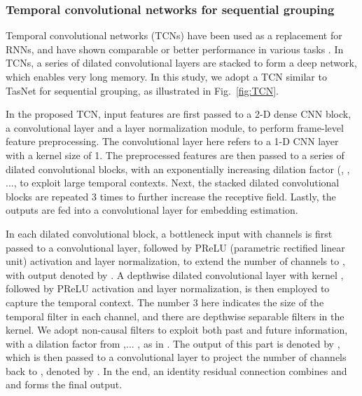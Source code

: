 \documentclass[journal]{IEEEtran}
\begin{document}
    
\subsubsection{Temporal convolutional networks for sequential grouping}
\label{sec:4.2.1}

Temporal convolutional networks (TCNs) have been used as a replacement for RNNs, and have shown comparable or better performance in various tasks \cite{TCN1} \cite{TCN0} \cite{Tasnet} \cite{ashu}.
In TCNs, a series of dilated convolutional layers are stacked to form a deep network, which enables very long memory.
In this study, we adopt a TCN similar to TasNet \cite{Tasnet} for sequential grouping, as illustrated in Fig.~\ref{fig:TCN}.


In the proposed TCN, input features are first passed to a 2-D dense CNN block, a  convolutional layer and a layer normalization module, to perform frame-level feature preprocessing.
The  convolutional layer here refers to a 1-D CNN layer with a kernel size of 1.
The preprocessed features are then passed to a series of dilated convolutional blocks, with an exponentially increasing dilation factor (, , ...,  to exploit large temporal contexts.
Next, the  stacked dilated convolutional blocks are repeated 3 times to further increase the receptive field.
Lastly, the outputs are fed into a  convolutional layer for embedding estimation.

In each dilated convolutional block, a bottleneck input with  channels  is first passed to a  convolutional layer, followed by PReLU (parametric rectified linear unit) activation \cite{prelu} and layer normalization, to extend the number of channels to , with output denoted by .
A depthwise dilated convolutional layer \cite{depthwise} with kernel , followed by PReLU activation and layer normalization, is then employed to capture the temporal context.
The number 3 here indicates the size of the temporal filter in each channel, and there are  depthwise separable filters in the kernel.
We adopt non-causal filters to exploit both past and future information, with a dilation factor from ,... , as in \cite{Tasnet}.
The output of this part is denoted by , which is then passed to a  convolutional layer to project the number of channels back to , denoted by .
In the end, an identity residual connection combines  and  and forms the final output. 
\end{document}
